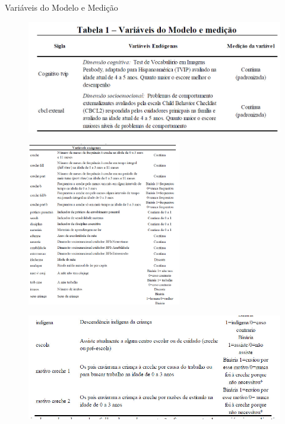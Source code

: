 \documentclass[10pt]{Beamer}
\begin{document}
\begin{frame}{Variáveis do Modelo e Medição}
	
	
	\begin{figure}[b]
		\centering
		\includegraphics[width=1.0\textwidth]{endo}
	\end{figure}
	
\end{frame}

\begin{frame}
	
	\begin{figure}[b]
		\centering
		\includegraphics[width=0.6\textwidth]{exo1}
	\end{figure}
	
\end{frame}

\begin{frame}
	
	\begin{figure}[b]
		\centering
		\includegraphics[width=1.0\textwidth]{exo2}
	\end{figure}
	
\end{frame}	
	
\end{document}
